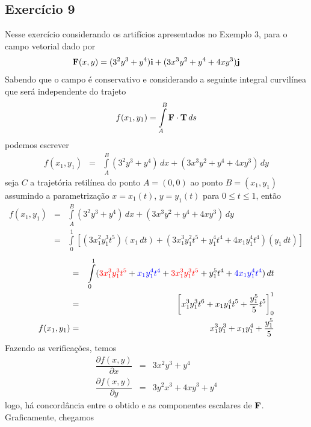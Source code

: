 \documentclass[a4paper, 12pt, brazilian]{article}
\begin{document}
	\subsection{Exercício 9}
	
	Nesse exercício considerando os artifícios apresentados no Exemplo 3, para o campo vetorial dado por
	\begin{equation}
		\textbf{F} (x,y)=(3^{2}y^{3}+y^{4})\textbf{i}+(3x^{3}y^{2}+y^{4}+4xy^{3})\textbf{j}
	\end{equation}
	Sabendo que o campo é conservativo e considerando a seguinte integral curvilínea que será independente do trajeto
	\begin{equation}
		f(x_{1},y_{1})=\int\limits_{A}^{B}\textbf{F}\cdot\textbf{T}\,ds
	\end{equation}
	podemos escrever
	\begin{eqnarray}
		f(x_{1},y_{1})&=&\int\limits_{A}^{B}(3^{2}y^{3}+y^{4})\,dx+(3x^{3}y^{2}+y^{4}+4xy^{3})\,dy
	\end{eqnarray}
	seja $C$ a trajetória retilínea do ponto $A=(0,0)$ ao ponto $B=(x_{1},y_{1})$ assumindo a parametrização $x=x_{1}(t)$, $y=y_{1}(t)$ para $0\leq t\leq 1$, então
	\begin{eqnarray}
	f(x_{1},y_{1})&=&\int\limits_{A}^{B}(3^{2}y^{3}+y^{4})\,dx+(3x^{3}y^{2}+y^{4}+4xy^{3})\,dy\\
	&=&\int\limits_{0}^{1}[(3x_{1}^{2}y_{1}^{3}t^{5})(x_{1}\,dt)+(3x_{1}^{3}y_{1}^{2}t^{5}+y_{1}^{4}t^{4}+4x_{1}y_{1}^{4}t^{4})(y_{1}\,dt)]
	\end{eqnarray}
	\begin{eqnarray}
		&=&\int\limits_{0}^{1}(\textcolor{red}{3x_{1}^{3}y_{1}^{3}t^{5}}+\textcolor{blue}{x_{1}y_{1}^{4}t^{4}}+\textcolor{red}{3x_{1}^{3}y_{1}^{3}t^{5}}+y_{1}^{5}t^{4}+\textcolor{blue}{4x_{1}y_{1}^{4}t^{4}})\,dt\\
		&=&\left[x_{1}^{3}y_{1}^{3}t^{6}+x_{1}y_{1}^{4}t^{5}+\dfrac{y_{1}^{5}}{5}t^{5}\right]_{0}^{1}\\
		f(x_{1},y_{1})&=&x_{1}^{3}y_{1}^{3}+x_{1}y_{1}^{4}+\dfrac{y_{1}^{5}}{5}
	\end{eqnarray}
	Fazendo as verificações, temos
	\begin{eqnarray}
		\dfrac{\partial f(x,y)}{\partial x}&=&3x^{2}y^{3}+y^{4}\\
		\dfrac{\partial f(x,y)}{\partial y}&=&3y^{2}x^{3}+4xy^{3}+y^{4}
	\end{eqnarray}
	logo, há concordância entre o obtido e as componentes escalares de $\textbf{F}$. Graficamente, chegamos
\end{document}
